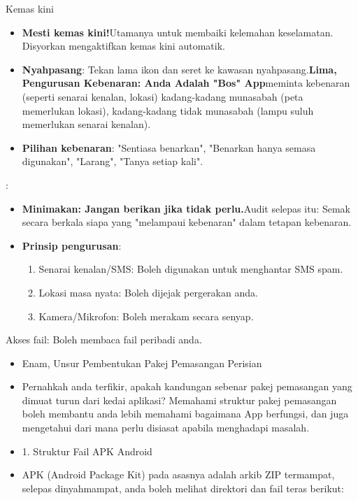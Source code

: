Kemas kini


\begin{itemize}
  \item \textbf{Mesti kemas kini!}Utamanya untuk membaiki kelemahan keselamatan. Disyorkan mengaktifkan kemas kini automatik.
  \item \textbf{Nyahpasang}: Tekan lama ikon dan seret ke kawasan nyahpasang.\textbf{Lima, Pengurusan Kebenaran: Anda Adalah "Bos" App}meminta kebenaran (seperti senarai kenalan, lokasi) kadang-kadang munasabah (peta memerlukan lokasi), kadang-kadang tidak munasabah (lampu suluh memerlukan senarai kenalan).
  \item \textbf{Pilihan kebenaran}: "Sentiasa benarkan", "Benarkan hanya semasa digunakan", "Larang", "Tanya setiap kali".
\end{itemize}


:

\begin{itemize}
  \item \textbf{Minimakan: Jangan berikan jika tidak perlu.}Audit selepas itu: Semak secara berkala siapa yang "melampaui kebenaran" dalam tetapan kebenaran.
  \item \textbf{Prinsip pengurusan}:
  \begin{enumerate}
    \item Senarai kenalan/SMS: Boleh digunakan untuk menghantar SMS spam.
    \item Lokasi masa nyata: Boleh dijejak pergerakan anda.
    \item Kamera/Mikrofon: Boleh merakam secara senyap.
  \end{enumerate}
\end{itemize}

\begin{tcbwarn}{Akses fail: Boleh membaca fail peribadi anda.}
\begin{itemize}
  \item Enam, Unsur Pembentukan Pakej Pemasangan Perisian
  \item Pernahkah anda terfikir, apakah kandungan sebenar pakej pemasangan yang dimuat turun dari kedai aplikasi? Memahami struktur pakej pemasangan boleh membantu anda lebih memahami bagaimana App berfungsi, dan juga mengetahui dari mana perlu disiasat apabila menghadapi masalah.
  \item 1. Struktur Fail APK Android
  \item APK (Android Package Kit) pada asasnya adalah arkib ZIP termampat, selepas dinyahmampat, anda boleh melihat direktori dan fail teras berikut:
\end{itemize}

\end{tcbwarn}

